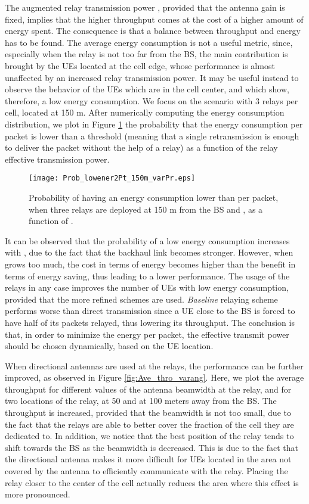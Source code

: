 \documentclass[12pt, letterpaper, onecolumn, draftcls]{IEEEtran}
\newcommand{\figw}{0.55\columnwidth}
\begin{document}
The augmented relay transmission power , provided that the antenna gain  is fixed, implies that the higher throughput comes at the cost of a higher amount of energy spent. The consequence is that a balance between throughput and energy has to be found.
The average energy consumption is not a useful metric, since, especially when the relay is not too far from the BS, the main contribution is brought by the UEs located at the cell edge, whose performance is almost unaffected by an increased relay transmission power.
It may be useful instead to observe the behavior of the UEs which are in the cell center, and which show, therefore, a low energy consumption. We focus on the scenario with 3 relays per cell, located at 150 m. After numerically computing the energy consumption distribution, we plot in Figure \ref{fig:Prob_lowener2Pt_150m_varPr} the probability that the energy consumption per packet is lower than a threshold  (meaning that a single retransmission is enough to deliver the packet without the help of a relay) as a function of the relay effective transmission power.
\begin{figure}
    \centering
    \texttt{[image: Prob\_lowener2Pt\_150m\_varPr.eps]}
     \caption{\small Probability of having an energy consumption lower than  per packet, when three relays are deployed at 150 m from the BS and , as a function of .}
     \vspace{-1cm}
  \label{fig:Prob_lowener2Pt_150m_varPr}
\end{figure}
It can be observed that the probability of a low energy consumption increases with , due to the fact that the backhaul link becomes stronger. However, when  grows too much, the cost in terms of energy becomes higher than the benefit in terms of energy saving, thus leading to a lower performance.
The usage of the relays in any case improves the number of UEs with low energy consumption, provided that the more refined schemes are used. \textit{Baseline} relaying scheme performs worse than direct transmission since a UE close to the BS is forced to have half of its packets relayed, thus lowering its throughput.
The conclusion is that, in order to minimize the energy per packet, the effective transmit power  should be chosen dynamically, based on the UE location.

When directional antennas are used at the relays, the performance can be further improved, as observed in Figure \ref{fig:Ave_thro_varang}. Here, we plot the average throughput for different values of the antenna beamwidth at the relay, and for two locations of the relay, at 50 and at 100 meters away from the BS. The throughput is increased, provided that the beamwidth is not too small, due to the fact that the relays are able to better cover the fraction of the cell they are dedicated to.
In addition, we notice that the best position of the relay tends to shift towards the BS as the beamwidth is decreased. This is due to the fact that the directional antenna makes it more difficult for UEs located in the area not covered by the antenna to efficiently communicate with the relay. Placing the relay closer to the center of the cell actually reduces the area where this effect is more pronounced.
\end{document}
